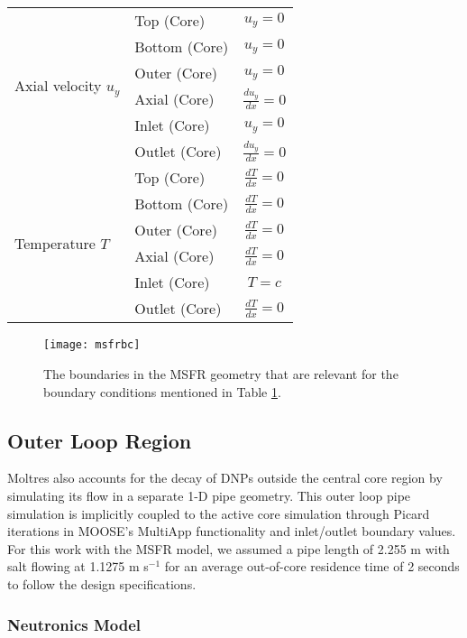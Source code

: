\begin{table}[htbp!]
\begin{tabular}{ l l c}
        \multirow{6}{*}{Axial velocity $u_y$} & Top (Core) & $u_y = 0$ \\
        & Bottom (Core) & $u_y = 0$ \\
        & Outer (Core) & $u_y = 0$ \\
        & Axial (Core) & $\frac{d u_y}{dx} = 0$ \\
        & Inlet (Core) & $u_y = 0$ \\
        & Outlet (Core) & $\frac{d u_y}{dx} = 0$ \\
        \midrule
        \multirow{6}{*}{Temperature $T$} & Top (Core) &
        $\frac{d T}{dx} = 0$ \\
        & Bottom (Core) & $\frac{d T}{dx} = 0$ \\
        & Outer (Core) & $\frac{d T}{dx} = 0$ \\
        & Axial (Core) & $\frac{d T}{dx} = 0$ \\
        & Inlet (Core) & $T = c$ \\
        & Outlet (Core) & $\frac{d T}{dx} = 0$ \\
		\bottomrule
	\end{tabular}
	\label{table:corebc}
\end{table}

\clearpage

\begin{figure}[htb!]
    \centering
    \texttt{[image: msfrbc]}
    \caption{The boundaries in the \gls{MSFR} geometry that are relevant for
    the boundary conditions mentioned in Table \ref{table:corebc}.}
    \label{fig:msfrbc}
\end{figure}

\subsection{Outer Loop Region}

Moltres also accounts for the decay of
\glspl{DNP} outside the central core region by simulating its flow in a
separate 1-D pipe geometry. This outer loop pipe simulation is implicitly
coupled to the active core simulation through Picard iterations in MOOSE's
MultiApp functionality and inlet/outlet boundary values. For this work with
the \gls{MSFR} model, we assumed a pipe
length of 2.255 m with salt flowing at 1.1275 m s$^{-1}$ for an average
out-of-core residence time of 2 seconds to follow the design specifications.

\subsubsection{Neutronics Model}

